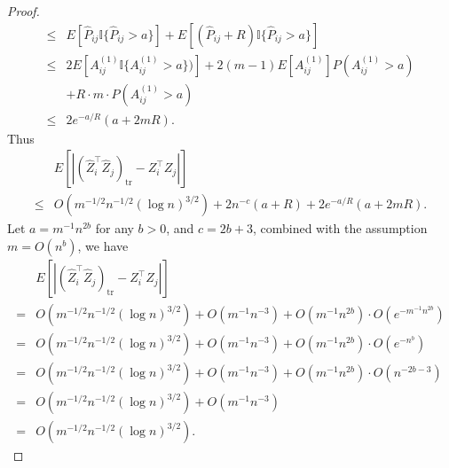 \begin{proof}
\begin{align*}
	\le & E[\hat{P}_{ij} \mathbb{I}\{\hat{P}_{ij} > a\}] + E[(\hat{P}_{ij} + R) \mathbb{I}\{\hat{P}_{ij} > a\}] \\
	\le & 2 E[A_{ij}^{(1)} \mathbb{I} \{ A_{ij}^{(1)} > a \})] + 2(m-1) E[A_{ij}^{(1)}] P(A_{ij}^{(1)} > a) \\
	& + R \cdot m \cdot P(A_{ij}^{(1)} > a) \\
	\le & 2 e^{-a/R} (a + 2 m R).
\end{align*}
Thus
\begin{align*}
	& E[|(\hat{Z}_i^{\top} \hat{Z}_j)_{\mathrm{tr}} - Z_i^{\top} Z_j|] \\
	\le & O(m^{-1/2} n^{-1/2} (\log n)^{3/2}) + 2 n^{-c} (a + R) + 2 e^{-a/R} (a + 2 m R).
\end{align*}
Let $a = m^{-1} n^{2b}$ for any $b > 0$, and $c = 2b + 3$, combined with the assumption $m = O(n^{b})$, we have
\begin{align*}
	& E[|(\hat{Z}_i^{\top} \hat{Z}_j)_{\mathrm{tr}} - Z_i^{\top} Z_j|] \\
	= & O(m^{-1/2} n^{-1/2} (\log n)^{3/2}) + O(m^{-1} n^{-3}) + O(m^{-1} n^{2b}) \cdot O(e^{-m^{-1} n^{2b}}) \\
	= & O(m^{-1/2} n^{-1/2} (\log n)^{3/2}) + O(m^{-1} n^{-3}) + O(m^{-1} n^{2b}) \cdot O(e^{- n^{b}}) \\
	= & O(m^{-1/2} n^{-1/2} (\log n)^{3/2}) + O(m^{-1} n^{-3}) + O(m^{-1} n^{2b}) \cdot O(n^{-2b-3}) \\
	= & O(m^{-1/2} n^{-1/2} (\log n)^{3/2}) + O(m^{-1} n^{-3}) \\
	= & O(m^{-1/2} n^{-1/2} (\log n)^{3/2}).
\end{align*}
\end{proof}

